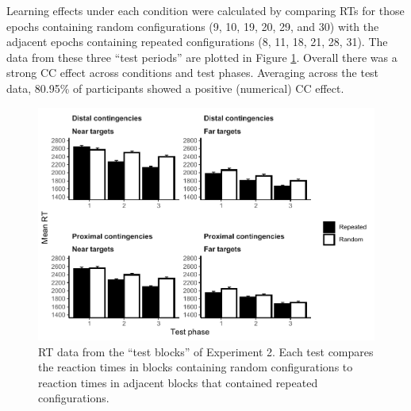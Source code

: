 \documentclass[
  english,
  man,floatsintext]{apa7}
\begin{document}
Learning effects under each condition were calculated by comparing RTs for those epochs containing random configurations (9, 10, 19, 20, 29, and 30) with the adjacent epochs containing repeated configurations (8, 11, 18, 21, 28, 31). The data from these three ``test periods'' are plotted in Figure \ref{fig:Exp2-test-figure}. Overall there was a strong CC effect across conditions and test phases. Averaging across the test data, 80.95\% of participants showed a positive (numerical) CC effect.



\begin{figure}

{\centering \includegraphics[width=1\linewidth]{CCVR_manuscript_files/figure-latex/Exp2-test-figure-1} 

}

\caption{RT data from the ``test blocks'' of Experiment 2. Each test compares the reaction times in blocks containing random configurations to reaction times in adjacent blocks that contained repeated configurations.}\label{fig:Exp2-test-figure}
\end{figure}
\end{document}
